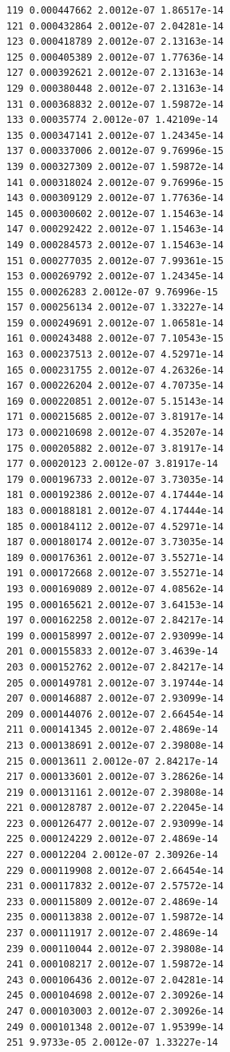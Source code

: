\documentclass{article}
\begin{document}
\begin{verbatim}
119 0.000447662 2.0012e-07 1.86517e-14
121 0.000432864 2.0012e-07 2.04281e-14
123 0.000418789 2.0012e-07 2.13163e-14
125 0.000405389 2.0012e-07 1.77636e-14
127 0.000392621 2.0012e-07 2.13163e-14
129 0.000380448 2.0012e-07 2.13163e-14
131 0.000368832 2.0012e-07 1.59872e-14
133 0.00035774 2.0012e-07 1.42109e-14
135 0.000347141 2.0012e-07 1.24345e-14
137 0.000337006 2.0012e-07 9.76996e-15
139 0.000327309 2.0012e-07 1.59872e-14
141 0.000318024 2.0012e-07 9.76996e-15
143 0.000309129 2.0012e-07 1.77636e-14
145 0.000300602 2.0012e-07 1.15463e-14
147 0.000292422 2.0012e-07 1.15463e-14
149 0.000284573 2.0012e-07 1.15463e-14
151 0.000277035 2.0012e-07 7.99361e-15
153 0.000269792 2.0012e-07 1.24345e-14
155 0.00026283 2.0012e-07 9.76996e-15
157 0.000256134 2.0012e-07 1.33227e-14
159 0.000249691 2.0012e-07 1.06581e-14
161 0.000243488 2.0012e-07 7.10543e-15
163 0.000237513 2.0012e-07 4.52971e-14
165 0.000231755 2.0012e-07 4.26326e-14
167 0.000226204 2.0012e-07 4.70735e-14
169 0.000220851 2.0012e-07 5.15143e-14
171 0.000215685 2.0012e-07 3.81917e-14
173 0.000210698 2.0012e-07 4.35207e-14
175 0.000205882 2.0012e-07 3.81917e-14
177 0.00020123 2.0012e-07 3.81917e-14
179 0.000196733 2.0012e-07 3.73035e-14
181 0.000192386 2.0012e-07 4.17444e-14
183 0.000188181 2.0012e-07 4.17444e-14
185 0.000184112 2.0012e-07 4.52971e-14
187 0.000180174 2.0012e-07 3.73035e-14
189 0.000176361 2.0012e-07 3.55271e-14
191 0.000172668 2.0012e-07 3.55271e-14
193 0.000169089 2.0012e-07 4.08562e-14
195 0.000165621 2.0012e-07 3.64153e-14
197 0.000162258 2.0012e-07 2.84217e-14
199 0.000158997 2.0012e-07 2.93099e-14
201 0.000155833 2.0012e-07 3.4639e-14
203 0.000152762 2.0012e-07 2.84217e-14
205 0.000149781 2.0012e-07 3.19744e-14
207 0.000146887 2.0012e-07 2.93099e-14
209 0.000144076 2.0012e-07 2.66454e-14
211 0.000141345 2.0012e-07 2.4869e-14
213 0.000138691 2.0012e-07 2.39808e-14
215 0.00013611 2.0012e-07 2.84217e-14
217 0.000133601 2.0012e-07 3.28626e-14
219 0.000131161 2.0012e-07 2.39808e-14
221 0.000128787 2.0012e-07 2.22045e-14
223 0.000126477 2.0012e-07 2.93099e-14
225 0.000124229 2.0012e-07 2.4869e-14
227 0.00012204 2.0012e-07 2.30926e-14
229 0.000119908 2.0012e-07 2.66454e-14
231 0.000117832 2.0012e-07 2.57572e-14
233 0.000115809 2.0012e-07 2.4869e-14
235 0.000113838 2.0012e-07 1.59872e-14
237 0.000111917 2.0012e-07 2.4869e-14
239 0.000110044 2.0012e-07 2.39808e-14
241 0.000108217 2.0012e-07 1.59872e-14
243 0.000106436 2.0012e-07 2.04281e-14
245 0.000104698 2.0012e-07 2.30926e-14
247 0.000103003 2.0012e-07 2.30926e-14
249 0.000101348 2.0012e-07 1.95399e-14
251 9.9733e-05 2.0012e-07 1.33227e-14

\end{verbatim}
\end{document}

